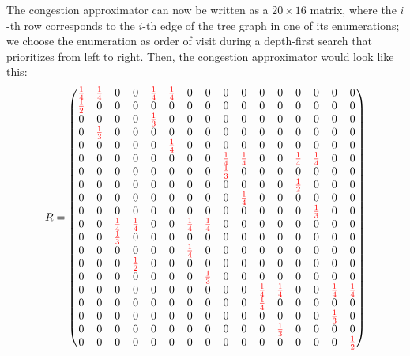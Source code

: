 The congestion approximator can now be written as a $20\times 16$ matrix, where the $i$-th row corresponds to the $i$-th edge of the tree graph in one of its enumerations; we choose the enumeration as order of visit during a depth-first search that prioritizes from left to right. Then, the congestion approximator would look like this:
\begin{align*}
\setcounter{MaxMatrixCols}{20}
\begingroup
\renewcommand*{\arraystretch}{0.9}
R=\begin{pmatrix}
\color{red}\frac{1}{4}&\color{red}\frac{1}{4}&0&0&\color{red}\frac{1}{4}&\color{red}\frac{1}{4}&0&0&0&0&0&0&0&0&0&0\\
\color{red}\frac{1}{2}&0&0&0&0&0&0&0&0&0&0&0&0&0&0&0\\
0&0&0&0&\color{red}\frac{1}{3}&0&0&0&0&0&0&0&0&0&0&0\\
0&\color{red}\frac{1}{3}&0&0&0&0&0&0&0&0&0&0&0&0&0&0\\
0&0&0&0&0&\color{red}\frac{1}{4}&0&0&0&0&0&0&0&0&0&0\\
0&0&0&0&0&0&0&0&\color{red}\frac{1}{4}&\color{red}\frac{1}{4}&0&0&\color{red}\frac{1}{4}&\color{red}\frac{1}{4}&0&0\\
0&0&0&0&0&0&0&0&\color{red}\frac{1}{3}&0&0&0&0&0&0&0\\
0&0&0&0&0&0&0&0&0&0&0&0&\color{red}\frac{1}{2}&0&0&0\\
0&0&0&0&0&0&0&0&0&\color{red}\frac{1}{4}&0&0&0&0&0&0\\
0&0&0&0&0&0&0&0&0&0&0&0&0&\color{red}\frac{1}{3}&0&0\\
0&0&\color{red}\frac{1}{4}&\color{red}\frac{1}{4}&0&0&\color{red}\frac{1}{4}&\color{red}\frac{1}{4}&0&0&0&0&0&0&0&0\\
0&0&\color{red}\frac{1}{3}&0&0&0&0&0&0&0&0&0&0&0&0&0\\
0&0&0&0&0&0&\color{red}\frac{1}{4}&0&0&0&0&0&0&0&0&0\\
0&0&0&\color{red}\frac{1}{2}&0&0&0&0&0&0&0&0&0&0&0&0\\
0&0&0&0&0&0&0&\color{red}\frac{1}{3}&0&0&0&0&0&0&0&0\\
0&0&0&0&0&0&0&0&0&0&\color{red}\frac{1}{4}&\color{red}\frac{1}{4}&0&0&\color{red}\frac{1}{4}&\color{red}\frac{1}{4}\\
0&0&0&0&0&0&0&0&0&0&\color{red}\frac{1}{4}&0&0&0&0&0\\
0&0&0&0&0&0&0&0&0&0&0&0&0&0&\color{red}\frac{1}{3}&0\\
0&0&0&0&0&0&0&0&0&0&0&\color{red}\frac{1}{3}&0&0&0&0\\
0&0&0&0&0&0&0&0&0&0&0&0&0&0&0&\color{red}\frac{1}{2}
\end{pmatrix}
\endgroup
\end{align*}
